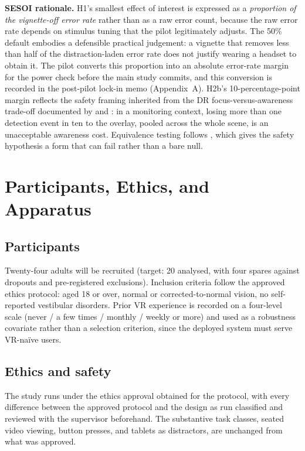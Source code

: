 \textbf{SESOI rationale.} H1's smallest effect of interest is expressed as a \textit{proportion of the
vignette-off error rate} rather than as a raw error count, because the raw error rate depends on
stimulus tuning that the pilot legitimately adjusts. The 50\% default embodies a defensible practical
judgement: a vignette that removes less than half of the distraction-laden error rate does not justify
wearing a headset to obtain it. The pilot converts this proportion into an absolute error-rate margin
for the power check before the main study commits, and this conversion is recorded in the post-pilot
lock-in memo (Appendix~A). H2b's 10-percentage-point margin reflects the safety framing inherited
from the DR focus-versus-awareness trade-off documented by \citet{mclaughlin2025} and \citet{murph2021}: in a monitoring context, losing more than one detection event in ten to the overlay,
pooled across the whole scene, is an unacceptable awareness cost. Equivalence testing follows \citet{lakens2017}, which gives the safety hypothesis a form that can fail rather than a bare null.

\section{Participants, Ethics, and Apparatus}

\subsection{Participants}

Twenty-four adults will be recruited (target: 20 analysed, with four spares against dropouts and
pre-registered exclusions). Inclusion criteria follow the approved ethics protocol: aged 18 or over,
normal or corrected-to-normal vision, no self-reported vestibular disorders. Prior VR experience is
recorded on a four-level scale (never / a few times / monthly / weekly or more) and used as a
robustness covariate rather than a selection criterion, since the deployed system must serve VR-naïve
users.

\subsection{Ethics and safety}

The study runs under the ethics approval obtained for the protocol, with every difference between the
approved protocol and the design as run classified and reviewed with the supervisor beforehand. The
substantive task classes, seated video viewing, button presses, and tablets as distractors, are
unchanged from what was approved.

